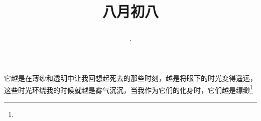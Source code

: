 \title{\date[d=10,m=9,y=2024][year:cn-y,年,month:cn,day:cn,日,·,weekday]·八月初八 }
它越是在薄纱和透明中让我回想起死去的那些时刻，越是将眼下的时光变得遥远，这些时光环绕我的时候就越是雾气沉沉，当我作为它们的化身时，它们越是缥缈\footnote{ }

